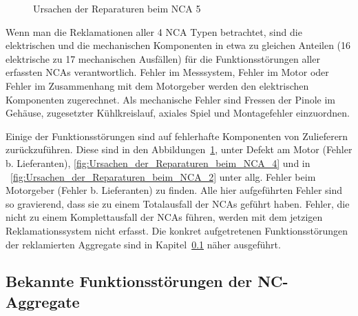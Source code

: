 \begin{figure}[H]

\caption{Ursachen der Reparaturen beim NCA 5}
\label{fig:Ursachen_der_Reparaturen_beim_NCA_5}
\end{figure}









Wenn man die Reklamationen aller 4 NCA Typen betrachtet, sind die elektrischen und die mechanischen  Komponenten in etwa zu gleichen Anteilen (16 elektrische zu 17 mechanischen Ausfällen) für die Funktionsstörungen aller erfassten NCAs verantwortlich. Fehler im Messsystem, Fehler im Motor oder Fehler im Zusammenhang mit dem Motorgeber werden den elektrischen Komponenten zugerechnet. Als mechanische Fehler sind Fressen der Pinole im Gehäuse, zugesetzter Kühlkreislauf, axiales Spiel und Montagefehler einzuordnen.



Einige der Funktionsstörungen sind auf fehlerhafte Komponenten von Zulieferern zurückzuführen. Diese sind in den Abbildungen~\ref{fig:Ursachen_der_Reparaturen_beim_NCA_5}, unter Defekt am Motor (Fehler b. Lieferanten), \ref{fig:Ursachen_der_Reparaturen_beim_NCA_4} und in ~\ref{fig:Ursachen_der_Reparaturen_beim_NCA_2} unter allg. Fehler beim Motorgeber (Fehler b. Lieferanten) zu finden. Alle hier aufgeführten Fehler sind so gravierend, dass sie zu einem Totalausfall der NCAs geführt haben. Fehler, die nicht zu einem Komplettausfall der NCAs führen, werden mit dem jetzigen Reklamationssystem nicht erfasst. Die konkret aufgetretenen Funktionsstörungen der reklamierten Aggregate sind in Kapitel~\ref{cha:Bekannte_Fehler_und_Probleme} näher ausgeführt.










\subsection{Bekannte Funktionsstörungen der NC-Aggregate} \label{cha:Bekannte_Fehler_und_Probleme}






